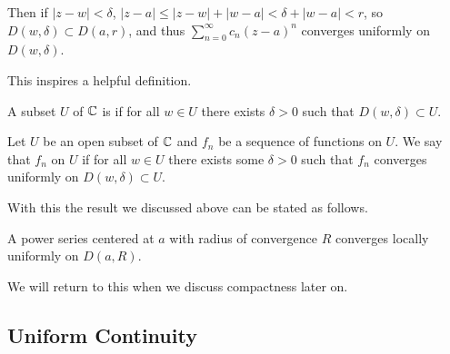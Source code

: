 \documentclass[a4paper]{scrartcl}
\begin{document}
\begin{center}

\end{center}

Then if $|z - w| < \delta$, $|z - a| \leq |z - w| + |w - a| < \delta + |w - a| < r$, so $D(w, \delta) \subset D(a, r)$, and thus $\sum_{n =0}^{\infty} c_n (z - a)^n$ converges uniformly on $D(w, \delta)$.

This inspires a helpful definition.

\begin{definition}[Open]
    A subset $U$ of $\mathbb{C}$ is  if for all $w \in U$ there exists $\delta > 0$ such that $D(w, \delta) \subset U$.
\end{definition}

\begin{definition}
    Let $U$ be an open subset of $\mathbb{C}$ and $f_n$ be a sequence of functions on $U$. We say that $f_n$  on $U$ if for all $w \in U$ there exists some $\delta > 0$ such that $f_n$ converges uniformly on $D(w, \delta) \subset U$.  
\end{definition}

With this the result we discussed above can be stated as follows.

\begin{theorem}
    A power series centered at $a$ with radius of convergence $R$ converges locally uniformly on $D(a, R)$.
\end{theorem}

We will return to this when we discuss compactness later on.

\subsection{Uniform Continuity}
\end{document}
